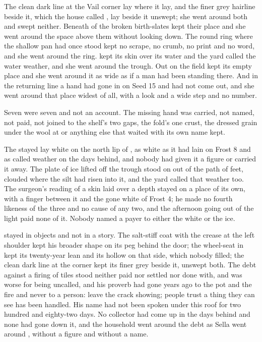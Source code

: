 The clean dark line at the Vail corner lay where it lay, and the finer grey hairline beside it, which the house called , lay beside it unswept; she went around both and swept neither. Beneath  of  the broken birth-slates kept their place and she went around the space above them without looking down. The round ring where the shallow pan had once stood kept no scrape, no crumb, no print and no word, and she went around the ring.  kept its skin over its water and the yard called the water weather, and she went around the trough. Out on  the field kept its empty place and she went around it as wide as if a man had been standing there. And in the returning line a hand had gone in on Seed 15 and had not come out, and she went around that place widest of all, with a look and a wide step and no number.

Seven were seven and not an account. The missing hand was carried, not named, not paid, not joined to the shelf's two gaps, the fold's one crust, the dressed grain under the wool at  or anything else that waited with its own name kept.

The stayed  lay white on the north lip of , as white as it had lain on Frost 8 and as called weather on the days behind, and nobody had given it a figure or carried it away. The plate of ice lifted off the trough stood on  out of the path of feet, clouded where the silt had risen into it, and the yard called that weather too. The surgeon's reading of a skin laid over a depth stayed on a place of its own, with a finger between it and the gone white of Frost 4; he made no fourth likeness of the three and no cause of any two, and the afternoon going out of the light paid none of it. Nobody named a payer to either the white or the ice.

 stayed in objects and not in a story. The salt-stiff coat with the crease at the left shoulder kept his broader shape on its peg behind the door; the wheel-seat in  kept its twenty-year lean and its hollow on that side, which nobody filled; the clean dark line at the corner kept its finer grey beside it, unswept both. The debt against a firing of tiles stood neither paid nor settled nor done with, and was worse for being uncalled, and his proverb had gone years ago to the pot and the fire and never to a person: leave the crack showing; people trust a thing they can see has been handled. His name had not been spoken under this roof for two hundred and eighty-two days. No collector had come up  in the days behind and none had gone down it, and the household went around the debt as Sella went around , without a figure and without a name.

